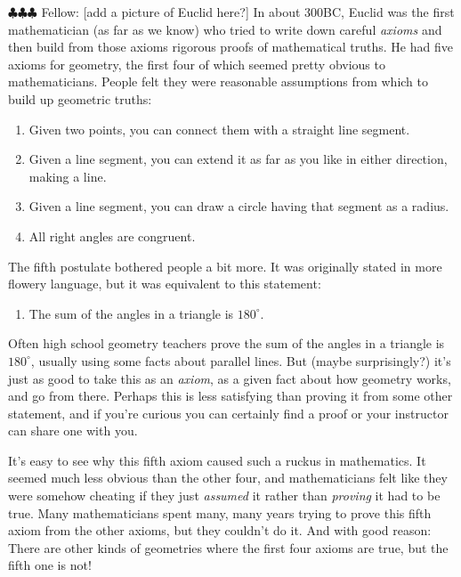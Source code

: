 \documentclass[12pt, reqno]{amsart}
\theoremstyle{remark}
\theoremstyle{definition}
\numberwithin{equation}{section}  %
\newcommand{\fellow}[1]{{\color{magenta} \sf $\clubsuit\clubsuit\clubsuit$ Fellow: [#1]}}
\begin{document}
\newpage

\fellow{add a picture of Euclid here?}
In about 300BC, Euclid was the first mathematician (as far as we know) who tried to write down careful \emph{axioms} and then build from those axioms rigorous proofs of mathematical truths.  He had five axioms for geometry, the first four of which seemed pretty obvious to mathematicians.  People felt they were reasonable assumptions from which to build up geometric truths:
\begin{enumerate}
\item
Given two points, you can connect them with a straight line segment.\\
\item
Given a line segment, you can extend it as far as you like in either direction, making a line.\\
\item
Given a line segment, you can draw a circle having that segment as a radius.\\
\item
All right angles are congruent.\\
\end{enumerate}
The fifth postulate bothered people a bit more. It was originally stated in more flowery language, but it was equivalent to this statement:

\begin{enumerate}
\addtocounter{enumi}{4}
\item
The sum of the angles in a triangle is $180^\circ$.\\
\end{enumerate}

Often high school geometry teachers prove the sum of the angles in a triangle is $180^\circ$, usually using some facts about parallel lines.  But (maybe surprisingly?) it's just as good to take this as an \emph{axiom}, as a given fact about how geometry works, and go from there.  Perhaps this is less satisfying than proving it from some other statement, and if you're curious you can certainly find a proof or your instructor can share one with you.


It's easy to see  why this fifth axiom caused such a ruckus in mathematics.  It seemed much less obvious than the other four, and mathematicians felt like they were somehow cheating if they just \emph{assumed} it rather than \emph{proving} it had to be true.  
Many mathematicians spent many, many years trying to prove this fifth axiom from the other axioms, but they couldn't do it.  And with good reason: There are other kinds of geometries where the first four axioms are true, but the fifth one is not!  
\end{document}
